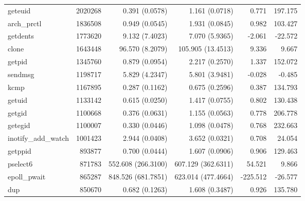 \begin{longtable}{>{\ttfamily}lrrrrr}
                        geteuid &    2020268 &              0.391 (0.0578) &            1.161 (0.0718) &           0.771 &      197.175 \\
                    arch\_prctl &    1836508 &              0.949 (0.0545) &            1.931 (0.0845) &           0.982 &      103.427 \\
                       getdents &    1773620 &              9.132 (7.4023) &            7.070 (5.9365) &          -2.061 &      -22.572 \\
                          clone &    1643448 &             96.570 (8.2079) &         105.905 (13.4513) &           9.336 &        9.667 \\
                         getpid &    1345760 &              0.879 (0.0954) &            2.217 (0.2570) &           1.337 &      152.072 \\
                        sendmsg &    1198717 &              5.829 (4.2347) &            5.801 (3.9481) &          -0.028 &       -0.485 \\
                           kcmp &    1167895 &              0.287 (0.1162) &            0.675 (0.2596) &           0.387 &      134.793 \\
                         getuid &    1133142 &              0.615 (0.0250) &            1.417 (0.0755) &           0.802 &      130.438 \\
                         getgid &    1100668 &              0.376 (0.0631) &            1.155 (0.0563) &           0.778 &      206.778 \\
                        getegid &    1100007 &              0.330 (0.0446) &            1.098 (0.0478) &           0.768 &      232.663 \\
            inotify\_add\_watch &    1001423 &              2.944 (0.0408) &            3.652 (0.0321) &           0.708 &       24.054 \\
                        getppid &     893877 &              0.700 (0.0444) &            1.607 (0.0906) &           0.906 &      129.463 \\
                       pselect6 &     871783 &          552.608 (266.3100) &        607.129 (362.6311) &          54.521 &        9.866 \\
                   epoll\_pwait &     865287 &          848.526 (681.7851) &        623.014 (477.4664) &        -225.512 &      -26.577 \\
                            dup &     850670 &              0.682 (0.1263) &            1.608 (0.3487) &           0.926 &      135.780 \\

\end{longtable}

